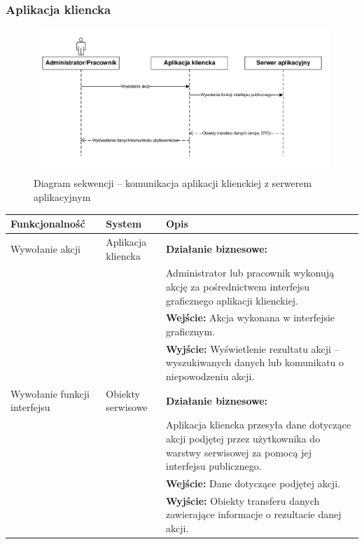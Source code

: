 \documentclass[10pt,a4paper]{article}
\begin{document}
\subsubsection{Aplikacja kliencka}
\begin{figure}[H]
	\includegraphics[width=16cm]{sequence-client.pdf}
	\caption{Diagram sekwencji -- komunikacja aplikacji klienckiej z serwerem aplikacyjnym}
\end{figure}
\begin{table}[H]
	\begin{tabularx}{\textwidth}{|l|l|X|}
		\hline
		\textbf{Funkcjonalność} & \textbf{System} & \textbf{Opis} \\
		\hline
		Wywołanie akcji &
		Aplikacja kliencka &
		\textbf{Działanie biznesowe:} \\
		& & Administrator lub pracownik wykonują akcję za pośrednictwem interfejsu graficznego aplikacji klienckiej. \\
		& & \textbf{Wejście:} Akcja wykonana w interfejsie graficznym. \\
		& & \textbf{Wyjście:} Wyświetlenie rezultatu akcji -- wyszukiwanych danych lub komunikatu o niepowodzeniu akcji. \\
		\hline
		Wywołanie funkcji interfejsu &
		Obiekty serwisowe &
		\textbf{Działanie biznesowe:} \\
		& & Aplikacja kliencka przesyła dane dotyczące akcji podjętej przez użytkownika do warstwy serwisowej za pomocą jej interfejsu publicznego. \\
		& & \textbf{Wejście:} Dane dotyczące podjętej akcji. \\
		& & \textbf{Wyjście:} Obiekty transferu danych zawierające informacje o rezultacie danej akcji. \\
		\hline
	\end{tabularx}
\end{table}
\end{document}
